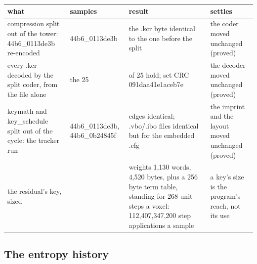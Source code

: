 {\footnotesize
\setlength{\tabcolsep}{6pt}
\begin{longtable}{>{\RaggedRight\arraybackslash}p{}>{\RaggedRight\arraybackslash}p{}>{\RaggedRight\arraybackslash}p{}>{\RaggedRight\arraybackslash}p{}}
\toprule
what & samples & result & settles \\
\midrule
\endhead
compression split out of the tower: 44b6\_\allowbreak{}0113de3b re-encoded & 44b6\_\allowbreak{}0113de3b & the .kcr byte identical to the one before the split & the coder moved unchanged (proved) \\
every .kcr decoded by the split coder, from the file alone & the 25 & 25 of 25 hold; set CRC 091daa41e1aceb7e & the decoder moved unchanged (proved) \\
keymath and key\_\allowbreak{}schedule split out of the cycle: the tracker run & 44b6\_\allowbreak{}0113de3b, 44b6\_\allowbreak{}0b24845f & edges identical; .vbo/.ibo files identical but for the embedded .cfg & the imprint and the layout moved unchanged (proved) \\
the residual's key, sized &  & weights 1,130 words, 4,520 bytes, plus a 256 byte term table, standing for 268 unit steps a voxel: 112,407,347,200 step applications a sample & a key's size is the program's reach, not its use \\
\bottomrule
\end{longtable}
}

\subsection{\texorpdfstring{The entropy history}{The entropy history}}

